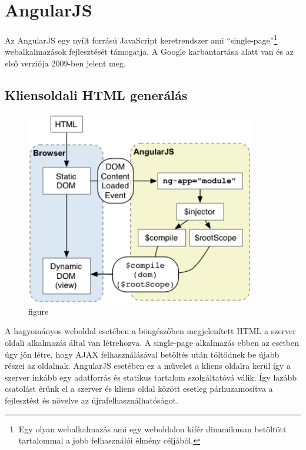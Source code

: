 \section{AngularJS}

Az AngularJS egy nyílt forrású JavaScript keretrendszer ami ``single-page''\footnote{Egy olyan webalkalmazás ami egy weboldalon kifér dinamikusan betöltött tartalommal a jobb felhasználói élmény céljából.} webalkalmazások fejlesztését támogatja. A Google karbantartása alatt van és az első verziója 2009-ben jelent meg. 

\subsection{Kliensoldali HTML generálás}

\begin{figure}[!ht]
\centering
\includegraphics[width=10cm,keepaspectratio]{figures/concepts-startup.png}
\caption{figure}
\label{fig:angularhtml}
\end{figure}

A hagyományos weboldal esetében a böngészőben megjelenített HTML a szerver oldali alkalmazás által van létrehozva.  A single-page alkalmazás ebben az esetben úgy jön létre, hogy AJAX felhasználásával betöltés után töltődnek be újabb részei az oldalnak\cite{angularbook}. AngularJS esetében ez a művelet a kliens oldalra kerül így a szerver inkább egy adatforrás és statikus tartalom szolgáltatóvá válik. Így lazább csatolást érünk el a szerver és kliens oldal között esetleg párhuzamosítva a fejlesztést és növelve az újrafelhasználhatóságot.\cite{AngularDocConcepts}





